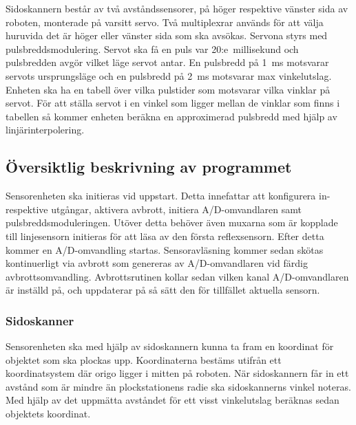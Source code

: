 

Sidoskannern består av två avståndssensorer, på höger respektive vänster sida av roboten, monterade på varsitt servo. Två multiplexrar används för att välja huruvida det är höger eller vänster sida som ska avsökas. Servona styrs med pulsbreddsmodulering. Servot ska få en puls var 20:e~millisekund och pulsbredden avgör vilket läge servot antar. En pulsbredd på 1~ms motsvarar servots ursprungsläge och en pulsbredd på 2~ms motsvarar max vinkelutslag. Enheten ska ha en tabell över vilka pulstider som motsvarar vilka vinklar på servot. För att ställa servot i en vinkel som ligger mellan de vinklar som finns i tabellen så kommer enheten beräkna en approximerad pulsbredd med hjälp av linjärinterpolering.


\subsection{Översiktlig beskrivning av programmet}

Sensorenheten ska initieras vid uppstart. Detta innefattar att konfigurera in- respektive utgångar, aktivera avbrott, initiera A/D-omvandlaren samt pulsbreddsmoduleringen. Utöver detta behöver även muxarna som är kopplade till linjesensorn initieras för att läsa av den första reflexsensorn. Efter detta kommer en A/D-omvandling startas. Sensoravläsning kommer sedan skötas kontinuerligt via avbrott som genereras av A/D-omvandlaren vid färdig avbrottsomvandling. Avbrottsrutinen kollar sedan vilken kanal A/D-omvandlaren är inställd på, och uppdaterar på så sätt den för tillfället aktuella sensorn.


\subsubsection{Sidoskanner}

Sensorenheten ska med hjälp av sidoskannern kunna ta fram en koordinat för objektet som ska plockas upp. Koordinaterna bestäms utifrån ett koordinatsystem där origo ligger i mitten på roboten. När sidoskannern får in ett avstånd som är mindre än plockstationens radie ska sidoskannerns vinkel noteras. Med hjälp av det uppmätta avståndet för ett visst vinkelutslag beräknas sedan objektets koordinat.



